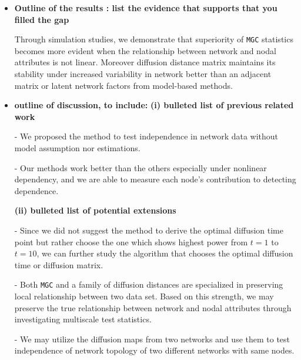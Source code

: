 \documentclass[12pt]{article}
\begin{document}
\begin{itemize}
\item  \textbf{Outline of the results : list the evidence that supports that you filled the gap}

 Through simulation studies, we demonstrate that superiority of \texttt{MGC} statistics becomes more evident when the relationship between network and nodal attributes is not linear. Moreover diffusion distance matrix maintains its stability under increased variability in network better than an adjacent matrix or latent network factors from model-based methods. 


\item  \textbf{outline of discussion, to include:}
\subitem \textbf{(i) bulleted list of previous related work}

-  We proposed the method to test independence in network data without model assumption nor estimations. 

- Our methods work better than the others especially under nonlinear dependency, and we are able to measure each node's contribution to detecting dependence.

\subitem \textbf{(ii) bulleted list of potential extensions} 

- Since we did not suggest the method to derive the optimal diffusion time point but rather choose the one which shows highest power from $t=1$ to $t=10$, we can further study the algorithm that chooses the optimal diffusion time or diffusion matrix. 

- Both \texttt{MGC} and a family of diffusion distances are specialized in preserving local relationship between two data set. Based on this strength, we may preserve the true relationship between network and nodal attributes through investigating multiscale test statistics.

- We may utilize the diffusion maps from two networks and use them to test independence of network topology of two different networks with same nodes. 
  
\end{itemize}
\end{document}
